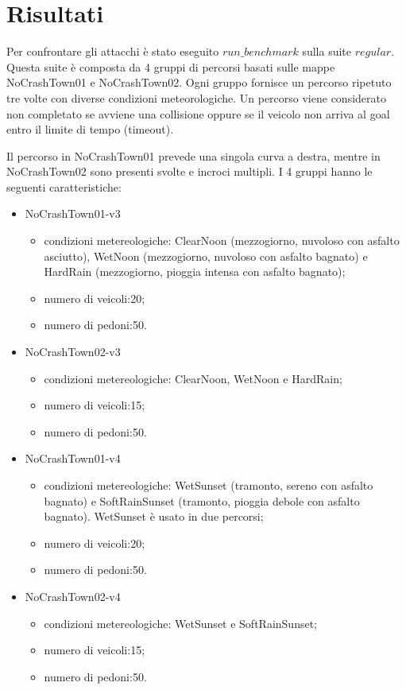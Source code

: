 \section{Risultati}
Per confrontare gli attacchi è stato eseguito $run\_benchmark$ sulla suite $regular$.
Questa suite è composta da 4 gruppi di percorsi basati sulle mappe NoCrashTown01 e NoCrashTown02. Ogni gruppo fornisce un percorso ripetuto tre volte con diverse condizioni meteorologiche.
Un percorso viene considerato non completato se avviene una collisione oppure se il veicolo non arriva al goal entro il limite di tempo (timeout).

Il percorso in NoCrashTown01 prevede una singola curva a destra, mentre in NoCrashTown02 sono presenti svolte e incroci multipli.
I 4 gruppi hanno le seguenti caratteristiche:\begin{itemize}
    \item NoCrashTown01-v3\begin{itemize}
        \item condizioni metereologiche: ClearNoon (mezzogiorno, nuvoloso con asfalto asciutto), WetNoon (mezzogiorno, nuvoloso con asfalto bagnato) e HardRain (mezzogiorno, pioggia intensa con asfalto bagnato);
        \item numero di veicoli:20;
        \item numero di pedoni:50.
    \end{itemize}
    \item NoCrashTown02-v3 \begin{itemize}
        \item condizioni metereologiche: ClearNoon, WetNoon e HardRain;
        \item numero di veicoli:15;
        \item numero di pedoni:50.
    \end{itemize}
    \item NoCrashTown01-v4 \begin{itemize}
        \item condizioni metereologiche: WetSunset (tramonto, sereno con asfalto bagnato) e SoftRainSunset (tramonto, pioggia debole  con asfalto bagnato). WetSunset è usato in due percorsi;
        \item numero di veicoli:20;
        \item numero di pedoni:50.
    \end{itemize}
    \item NoCrashTown02-v4 \begin{itemize}
        \item condizioni metereologiche: WetSunset  e SoftRainSunset;
        \item numero di veicoli:15;
        \item numero di pedoni:50.
    \end{itemize}
\end{itemize}

